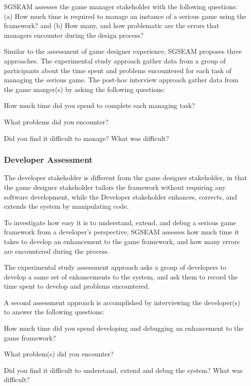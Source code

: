 \documentclass{sigchi}
\begin{document}
SGSEAM assesses the game manager stakeholder with the following questions: (a) How much time is
required to manage an instance of a serious game using the framework? and (b) How many,
and how problematic are the errors that managers encounter during the design process?

Similar to the assessment of game designer experience, SGSEAM proposes three approaches. The
experimental study approach gather data from a group of participants about the time spent and
problems encountered for each task of managing the serious game. The post-hoc interview approach
gather data from the game manger(s) by asking the following questions:

\begin{compactitem}
\item How much time did you spend to complete each managing task?
\item What problems did you encounter?
\item Did you find it difficult to manage? What was difficult?
\end{compactitem}

\subsubsection{Developer Assessment}

The developer stakeholder is different from the game designer stakeholder, in that the
game designer stakeholder tailors the framework without requiring any software
development, while the Developer stakeholder enhances, corrects, and extends the system by
manipulating code. 

To investigate how easy it is to understand, extend, and debug a serious game
framework from a developer's perspective, SGSEAM assesses how much time it takes to develop an
enhancement to the game framework, and how many errors are encountered
during the process.

The experimental study assessment approach asks a group of developers to develop a same set of
enhancements to the system, and ask them to record the time spent to develop and problems
encountered.

A second assessment approach is accomplished by interviewing the developer(s) to
answer the following questions:

\begin{compactitem}
\item How much time did you spend developing and debugging an
  enhancement to the game framework?
\item What problem(s) did you encounter?
\item Did you find it difficult to understand, extend and debug the
  system? What was difficult?
\end{compactitem}
\end{document}
